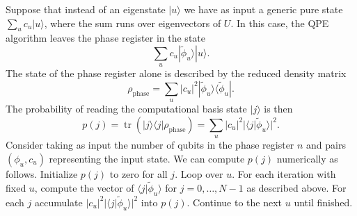 \documentclass[superscriptaddress,nofootinbib,longbibliography,aps,pre]{revtex4-1}
\newcommand{\tr}{{\operatorname{tr}}}
\newcommand{\ket}[1]{|{#1}\rangle}
\newcommand{\braket}[2]{\langle{#1}|{#2}\rangle}
\newcommand{\ketbra}[2]{|{#1}\rangle\!\langle{#2}|}
\begin{document}
Suppose that instead of an eigenstate $\ket{u}$ we have as input a generic pure state
$\sum_{u}c_{u}\ket{u}$, where the sum runs over eigenvectors of $U$.
In this case, the QPE algorithm leaves the phase register in the state
%
\begin{equation}
 \sum_{u} c_{u} \ket{\tilde\phi_{u}}\ket{u}.
\end{equation}
%
The state of the phase register alone is described by the reduced density matrix
%
\begin{equation}
 \rho_{\text{phase}}  = \sum_{u} |c_{u}|^{2} \ketbra{\tilde\phi_{u}}{\tilde\phi_{u}}.
\end{equation}
%
The probability of reading the computational basis state $\ket{j}$ is then
%
\begin{equation}
  p(j) = \tr\left(\ketbra{j}{j}\rho_{\text{phase}}\right)
   = \sum_{u} |c_{u}|^{2} |\braket{j}{\tilde\phi_{u}}|^{2}.
\end{equation}
%
Consider taking as input the number of qubits in the phase register $n$
and pairs $(\phi_{u}, c_{u})$ representing the input state.
We can compute $p(j)$ numerically as follows.
Initialize $p(j)$ to zero for all $j$.
Loop over $u$.
For each iteration with fixed $u$,
compute the vector of $\braket{j}{\tilde\phi_{u}}$ for $j=0,\ldots, N-1$ as described above.
For each $j$ accumulate $|c_{u}|^{2} |\braket{j}{\tilde\phi_{u}}|^{2}$ into $p(j)$.
Continue to the next $u$ until finished.
\end{document}
